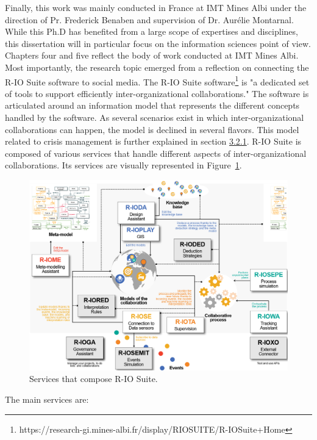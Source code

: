 Finally, this work was mainly conducted in France at IMT Mines Albi under the direction of Pr. Frederick Benaben and supervision of Dr. Aurélie Montarnal.
While this Ph.D has benefited from a large scope of expertises and disciplines, this dissertation will in particular focus on the information sciences point of view.
Chapters four and five reflect the body of work conducted at IMT Mines Albi.
Most importantly, the research topic emerged from a reflection on connecting the R-IO Suite software to social media.
The R-IO Suite software\footnote{https://research-gi.mines-albi.fr/display/RIOSUITE/R-IOSuite+Home} is "a dedicated set of tools to support efficiently inter-organizational collaborations."
The software is articulated around an information model that represents the different concepts handled by the software.
As several scenarios exist in which inter-organizational collaborations can happen, the model is declined in several flavors.
This model related to crisis management is further explained in section \hyperref[sec:crisismetamodel]{3.2.1}.
R-IO Suite is composed of various services that handle different aspects of inter-organizational collaborations.
Its services are visually represented in Figure~\ref{context:rio-services}.

\begin{figure}[htb]
    \centering
    \includegraphics[width=\textwidth,keepaspectratio]{figures/chap-1/rio-services.png}
    \caption{Services that compose R-IO Suite.}
    \label{context:rio-services}
\end{figure}

The main services are:

